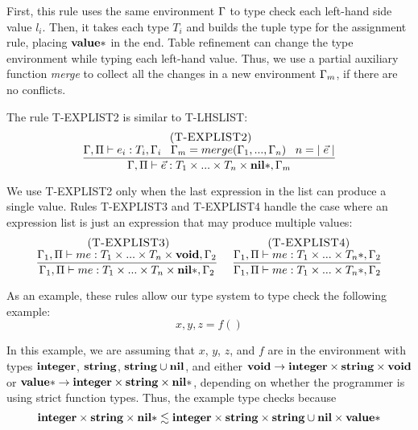 First, this rule uses the same environment $\Gamma$ to type check each
left-hand side value $l_{i}$.
Then, it takes each type $T_{i}$ and builds the tuple type for
the assignment rule, placing $\mathbf{value}{*}$ in the end.
Table refinement can change the type environment while typing each left-hand value.
Thus, we use a partial auxiliary function \emph{merge} to collect
all the changes in a new environment $\Gamma_{m}$, if there are no conflicts.

The rule \textsc{T-EXPLIST2} is similar to \textsc{T-LHSLIST}:
\[
\begin{array}{c}
\; (\textsc{T-EXPLIST2})\\
\dfrac{\Gamma, \Pi \vdash e_{i}:T_{i}, \Gamma_{i} \;\;\;
       \Gamma_{m} = merge(\Gamma_{1}, ..., \Gamma_{n}) \;\;\;
       n = |\;\vec{e}\;|}
      {\Gamma, \Pi \vdash \vec{e}:T_{1} \times ... \times T_{n} \times \mathbf{nil}{*}, \Gamma_{m}}
\end{array}
\]

We use \textsc{T-EXPLIST2} only when the last expression in the list
can produce a single value.
Rules \textsc{T-EXPLIST3} and \textsc{T-EXPLIST4} handle the case where
an expression list is just an expression that may produce multiple values:
\[
\begin{array}{c}
\begin{array}{c}
\; (\textsc{T-EXPLIST3})\\
\dfrac{\Gamma_{1}, \Pi \vdash me:T_{1} \times ... \times T_{n} \times \mathbf{void}, \Gamma_{2}}
      {\Gamma_{1}, \Pi \vdash me:T_{1} \times ... \times T_{n} \times \mathbf{nil}{*}, \Gamma_{2}}
\end{array}
\;
\begin{array}{c}
\; (\textsc{T-EXPLIST4})\\
\dfrac{\Gamma_{1}, \Pi \vdash me:T_{1} \times ... \times T_{n}{*}, \Gamma_{2}}
      {\Gamma_{1}, \Pi \vdash me:T_{1} \times ... \times T_{n}{*}, \Gamma_{2}}
\end{array}
\end{array}
\]

As an example, these rules allow our type system to type check the following example:
\[
x, y, z = f()
\]

In this example, we are assuming that $x$, $y$, $z$, and $f$ are in
the environment with types $\mathbf{integer}$, $\mathbf{string}$, $\mathbf{string} \cup \mathbf{nil}$, and
either $\mathbf{void} \rightarrow \mathbf{integer} \times \mathbf{string} \times \mathbf{void}$ or
$\mathbf{value}{*} \rightarrow \mathbf{integer} \times \mathbf{string} \times \mathbf{nil}{*}$,
depending on whether the programmer is using strict function types.
Thus, the example type checks because
\[
\mathbf{integer} \times \mathbf{string} \times \mathbf{nil}{*} \lesssim \mathbf{integer} \times \mathbf{string} \times \mathbf{string} \cup \mathbf{nil} \times \mathbf{value}{*}
\]

